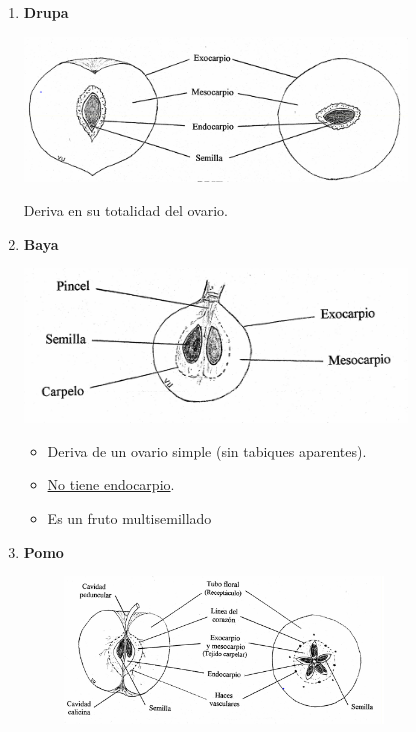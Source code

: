 \documentclass[a4paper,12pt,oneside]{book}
\begin{document}
\begin{enumerate}
\item \textbf{Drupa}
\label{sec:org3a09ac2}

\begin{center}
\includegraphics[width=0.8\textwidth]{./img_1481/drupa.PNG}
\end{center}

Deriva en su totalidad del ovario.

\vspace{3cm}
\item \textbf{Baya}
\label{sec:orgdc1a318}

\begin{center}
\includegraphics[width=0.8\textwidth]{./img_1481/baya.PNG}
\end{center}

\begin{itemize}
\item Deriva de un ovario simple (sin tabiques aparentes).
\item \uline{No tiene endocarpio}.
\item Es un fruto multisemillado
\end{itemize}
\newpage
\item \textbf{Pomo}
\label{sec:org351665a}

\begin{figure}[htbp]
\centering
\includegraphics[width=0.8\textwidth]{./img_1481/pomo.PNG}
\caption{}
\end{figure}


\end{enumerate}
\end{document}
